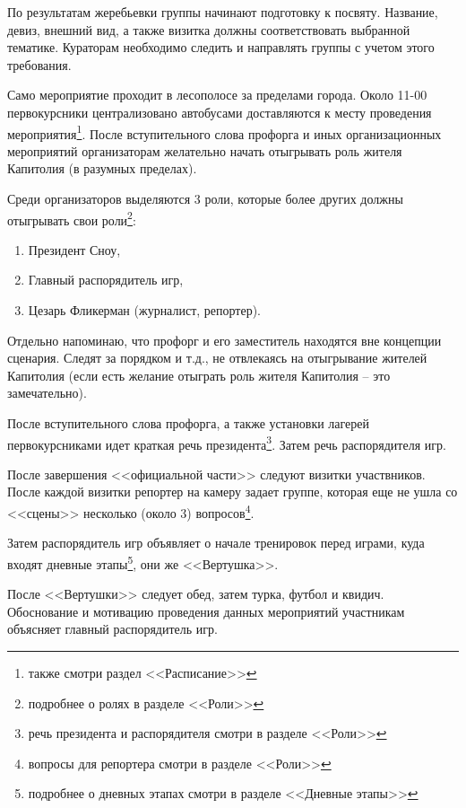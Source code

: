 \documentclass[a4paper, 14pt]{extarticle}
\theoremstyle{definition}
\begin{document}
\par По результатам жеребьевки группы начинают подготовку к посвяту. Название, девиз, внешний вид, а также визитка должны соответствовать выбранной тематике. Кураторам необходимо следить и направлять группы с учетом этого требования.

\par Само мероприятие проходит в лесополосе за пределами города. Около 11-00 первокурсники централизовано автобусами доставляются к месту проведения мероприятия\footnote{также смотри раздел <<Расписание>>}. После вступительного слова профорга и иных организационных мероприятий организаторам желательно начать отыгрывать роль жителя Капитолия (в разумных пределах).

\par Среди организаторов выделяются 3 роли, которые более других должны отыгрывать свои роли\footnote{подробнее о ролях в разделе <<Роли>>}:
\begin{enumerate}
\item Президент Сноу,
\item Главный распорядитель игр,
\item Цезарь Фликерман (журналист, репортер).
\end{enumerate}

\par Отдельно напоминаю, что профорг и его заместитель находятся вне концепции сценария. Следят за порядком и т.д., не отвлекаясь на отыгрывание жителей Капитолия (если есть желание отыграть роль жителя Капитолия -- это замечательно).

\par После вступительного слова профорга, а также установки лагерей первокурсниками идет краткая речь президента\footnote{речь президента и распорядителя смотри в разделе <<Роли>>}. Затем речь распорядителя игр.

\par После завершения <<официальной части>> следуют визитки участвников. После каждой визитки репортер на камеру задает группе, которая еще не ушла со <<сцены>> несколько (около 3) вопросов\footnote{вопросы для репортера смотри в разделе <<Роли>>}.

\par Затем распорядитель игр объявляет о начале тренировок перед играми, куда входят дневные этапы\footnote{подробнее о дневных этапах смотри в разделе <<Дневные этапы>>}, они же <<Вертушка>>.

\par После <<Вертушки>> следует обед, затем турка, футбол и квидич. Обоснование и мотивацию проведения данных мероприятий участникам объясняет главный распорядитель игр.
\end{document}
